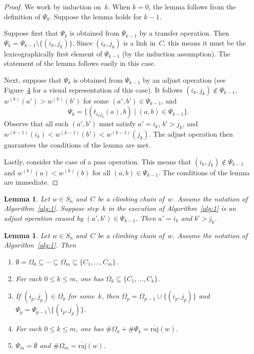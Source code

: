 \documentclass[10pt,a4paper]{amsart}
\newcommand{\absoverrajcode}[1]{\overline{\mathrm{raj}}(#1)}
\newtheorem{lemma}[theorem]{Lemma}
\begin{document}
\begin{proof}
	We work by induction on~$k$. When $k=0$, the lemma follows from the definition of $\Psi_0$. Suppose the lemma holds for $k-1$. 
	
	Suppose first that $\Psi_k$ is obtained from $\Psi_{k-1}$ by a transfer operation. Then $\Psi_k=\Psi_{k-1}\setminus \{(i_k,j_k)\}$. Since $(i_k,j_k)$ is a link in~$C$, this means it must be the lexicographically first element of $\Psi_{k-1}$ (by the induction assumption). The statement of the lemma follows easily in this case.
	
	Next, suppose that $\Psi_k$ is obtained from $\Psi_{k-1}$ by an adjust operation (see Figure~\href{https://alco.centre-mersenne.org/articles/10.5802/alco.358/}{4} for a visual representation of this case). It follows $(i_k,j_k)\notin \Psi_{k-1}$, $w^{(k)}(a')>w^{(k)}(b')$ for some $(a',b')\in \Psi_{k-1}$, and \[\Psi_k = \{(t_{i_kj_k}(a),b)\mid (a,b)\in \Psi_{k-1} \}. \] Observe that all such $(a',b')$ must satisfy $a'=i_k$, $b'>j_k$, and $w^{(k-1)}(i_k)<w^{(k-1)}(b')<w^{(k-1)}(j_k)$. The adjust operation then guarantees the conditions of the lemma are met.
	
	Lastly, consider the case of a pass operation. This means that $(i_k,j_k)\notin \Psi_{k-1}$ and $w^{(k)}(a)<w^{(k)}(b)$ for all $(a,b)\in \Psi_{k-1}$. The conditions of the lemma are immediate.
\end{proof}

\setcounter{section}{8}\setcounter{theorem}{3}
\begin{lemma}
	\label{lem:adjustcase}
	Let $w\in S_n$ and~$C$ be a climbing chain of~$w$. Assume the notation of Algorithm~\ref{alg:1}. Suppose step~$k$ in the execution of Algorithm~\ref{alg:1} is an adjust operation caused by $(a',b')\in \Psi_{k-1}$. Then $a'=i_k$ and $b'>j_k$.
\end{lemma}

\setcounter{section}{8}\setcounter{theorem}{4}
\begin{lemma}
	\label{lem:algbasicproperties}
	Let $w\in S_n$ and~$C$ be a climbing chain of~$w$. Assume the notation of Algorithm~\ref{alg:1}. Then 
	\begin{enumerate}[label=\textup{(\roman*)}]
		\item $\emptyset=\Omega_0\subseteq \cdots\subseteq \Omega_m\subseteq \{C_1,\ldots,C_m\}$.
		\item For each $0\leq k\leq m$, one has $\Omega_k\subseteq \{C_1,\ldots,C_k \}$.
		\item If $(i_p,j_p)\in \Omega_k$ for some~$k$, then $\Omega_p=\Omega_{p-1}\cup \{(i_p,j_p)\}$ and $\Psi_p=\Psi_{p-1}\setminus \{(i_p,j_p)\}$.
		\item For each $0\leq k\leq m$, one has $\#\Omega_k + \#\Psi_k = \absoverrajcode{w}.$
		\item $\Psi_m=\emptyset$ and $\#\Omega_m=\absoverrajcode{w}$.
	\end{enumerate}
\end{lemma}
\end{document}
